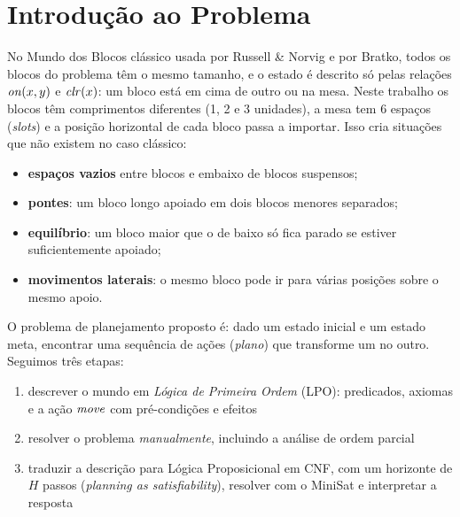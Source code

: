 \section{Introdução ao Problema}
\label{sec:intro}

No Mundo dos Blocos clássico usada por Russell \& Norvig e por Bratko, todos os blocos do problema têm o mesmo tamanho, e o estado
é descrito só pelas relações $\mathit{on}(x,y)$ e $\mathit{clr}(x)$: um bloco está em cima de
outro ou na mesa. Neste trabalho os blocos têm comprimentos diferentes
(1, 2 e 3 unidades), a mesa tem 6 espaços (\emph{slots}) e a
posição horizontal de cada bloco passa a importar. Isso cria situações
que não existem no caso clássico:
\begin{itemize}
	\item \textbf{espaços vazios} entre blocos e embaixo de blocos suspensos;
	\item \textbf{pontes}: um bloco longo apoiado em dois blocos menores separados;
	\item \textbf{equilíbrio}: um bloco maior que o de baixo só fica parado se
	estiver suficientemente apoiado;
	\item \textbf{movimentos laterais}: o mesmo bloco pode ir para várias posições
	sobre o mesmo apoio.
\end{itemize}

O problema de planejamento proposto é: dado um estado inicial e um estado meta,
encontrar uma sequência de ações (\emph{plano}) que transforme um no outro.
Seguimos três etapas:
\begin{enumerate}
	\item descrever o mundo em \emph{Lógica de Primeira Ordem} (LPO): predicados,
	axiomas e a ação $\mathit{move}$ com pré-condições e efeitos %
	\item resolver o problema \emph{manualmente}, incluindo a análise de
	ordem parcial %
	\item traduzir a descrição para Lógica Proposicional em CNF, com um
	horizonte de $H$ passos (\emph{planning as satisfiability}), resolver com o MiniSat e interpretar a resposta %
\end{enumerate}

